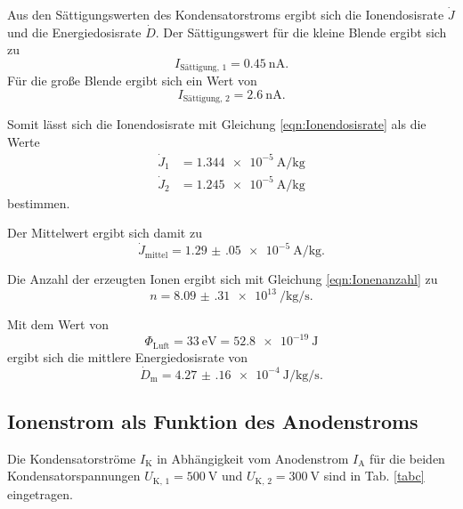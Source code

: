 \noindent Aus den Sättigungswerten des Kondensatorstroms ergibt sich die Ionendosisrate $\dot{J}$ und die Energiedosisrate $\dot{D}$. 
Der Sättigungswert für die kleine Blende ergibt sich zu 
\begin{equation*}
    I_\text{Sättigung, 1} = \SI{0.45}{\nano\ampere}.
\end{equation*}
Für die große Blende ergibt sich ein Wert von 
\begin{equation*}
    I_\text{Sättigung, 2} = \SI{2.6}{\nano\ampere}.
\end{equation*}

\noindent Somit lässt sich die Ionendosisrate mit Gleichung \eqref{eqn:Ionendosisrate} als die Werte  
\begin{align*}
    \dot{J}_\text{1} &= \SI{1.344e-5}{\ampere\per\kilo\gram}\\
    \dot{J}_\text{2} &= \SI{1.245e-5}{\ampere\per\kilo\gram} 
\end{align*}
bestimmen.

\noindent Der Mittelwert ergibt sich damit zu 
\begin{equation*}
    \dot{J}_\text{mittel} = \SI{1.29(05)e-5}{\ampere\per\kilo\gram}.
\end{equation*}

\noindent Die Anzahl der erzeugten Ionen ergibt sich mit Gleichung \eqref{eqn:Ionenanzahl} zu 
\begin{equation*}
    n = \SI{8.09(31)e13}{\per\kilo\gram\per\second}.
\end{equation*}

\noindent Mit dem Wert \cite{Luft} von 
\begin{equation*}
    \Phi_\text{Luft} = \SI{33}{\electronvolt} = \SI{52.8e-19}{\joule}
\end{equation*}
ergibt sich die mittlere Energiedosisrate von 
\begin{equation*}
    \dot{D}_\text{m} = \SI{4.27(16)e-4}{\joule\per\kilo\gram\per\second}.
\end{equation*}



\subsection{Ionenstrom als Funktion des Anodenstroms}

Die Kondensatorströme $I_\text{K}$ in Abhängigkeit vom
Anodenstrom $I_\text{A}$ für die beiden Kondensatorspannungen
$U_\text{K, 1} = \SI{500}{\volt}$ und $U_\text{K, 2} = \SI{300}{\volt}$
sind in Tab. \ref{tabc} eingetragen.

